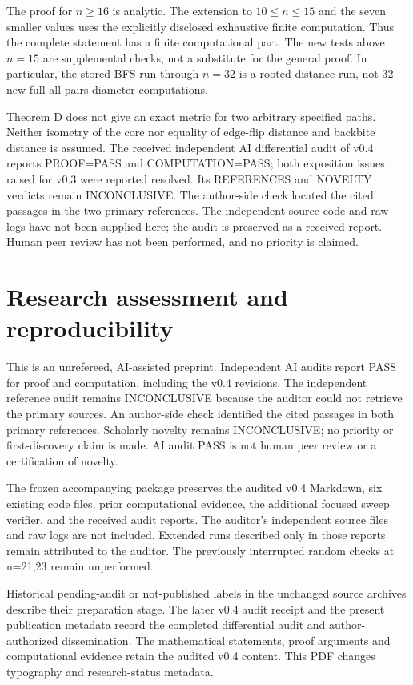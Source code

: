 \documentclass[11pt,a4paper]{article}
\begin{document}
The proof for \(n\ge16\) is analytic. The extension to \(10\le n\le15\) and the seven smaller values uses the explicitly disclosed exhaustive finite computation. Thus the complete statement has a finite computational part. The new tests above \(n=15\) are supplemental checks, not a substitute for the general proof. In particular, the stored BFS run through \(n=32\) is a rooted-distance run, not 32 new full all-pairs diameter computations.

Theorem D does not give an exact metric for two arbitrary specified paths. Neither isometry of the core nor equality of edge-flip distance and backbite distance is assumed. The received independent AI differential audit of v0.4 reports PROOF=PASS and COMPUTATION=PASS; both exposition issues raised for v0.3 were reported resolved. Its REFERENCES and NOVELTY verdicts remain INCONCLUSIVE. The author-side check located the cited passages in the two primary references. The independent source code and raw logs have not been supplied here; the audit is preserved as a received report. Human peer review has not been performed, and no priority is claimed.

\hypertarget{research-assessment-and-reproducibility}{%
\section{Research assessment and reproducibility}\label{research-assessment-and-reproducibility}}

This is an unrefereed, AI-assisted preprint. Independent AI audits report PASS for proof and computation, including the v0.4 revisions. The independent reference audit remains INCONCLUSIVE because the auditor could not retrieve the primary sources. An author-side check identified the cited passages in both primary references. Scholarly novelty remains INCONCLUSIVE; no priority or first-discovery claim is made. AI audit PASS is not human peer review or a certification of novelty.

The frozen accompanying package preserves the audited v0.4 Markdown, six existing code files, prior computational evidence, the additional focused sweep verifier, and the received audit reports. The auditor's independent source files and raw logs are not included. Extended runs described only in those reports remain attributed to the auditor. The previously interrupted random checks at n=21,23 remain unperformed.

Historical pending-audit or not-published labels in the unchanged source archives describe their preparation stage. The later v0.4 audit receipt and the present publication metadata record the completed differential audit and author-authorized dissemination. The mathematical statements, proof arguments and computational evidence retain the audited v0.4 content. This PDF changes typography and research-status metadata.
\end{document}
